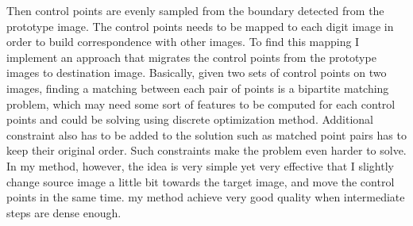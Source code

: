 \documentclass{iitthesis}
\begin{document}
Then control points are evenly sampled from the boundary detected from the prototype image. The control points needs to be mapped to each digit image in order to build correspondence with other images. To find this mapping I implement an approach that migrates the control points from the prototype images to destination image. Basically, given two sets of control points on two images, finding a matching between each pair of points is a bipartite matching problem, which may need some sort of features to be computed for each control points and could be solving using discrete optimization method. Additional constraint also has to be added to the solution such as matched point pairs has to keep their original order. Such constraints make the problem even harder to solve. In my method, however, the idea is very simple yet very effective that I slightly change source image a little bit towards the target image, and move the control points in the same time. my method achieve very good quality when intermediate steps are dense enough.
\end{document}

